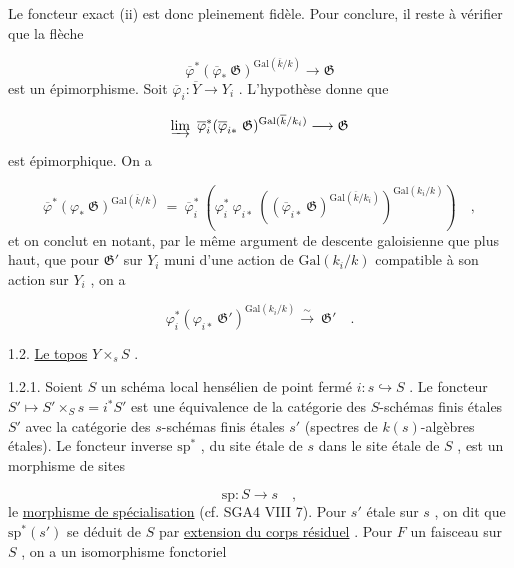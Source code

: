 Le foncteur exact (ii) est donc pleinement fidèle. Pour conclure, il reste à vérifier que la flèche

\begin{equation*}
\overline{\varphi}^*(\overline{\varphi}_* \ \mathfrak{G})^{\mathrm{Gal}(\overline{k}/k)} \longrightarrow \mathfrak{G}
\end{equation*}
est un épimorphisme. Soit $\overline{\varphi}_i : \overline{Y} \to Y_i$ . L'hypothèse donne que

\begin{equation*}
\varinjlim \ \overline{\varphi}_i^*(\overline{\varphi}_{i*} \ \mathfrak{G})^{\mathrm{Gal}(\overline{k}/k_i)} \longrightarrow \mathfrak{G} 
\end{equation*}


 est épimorphique. On a

\begin{equation*}
\overline{\varphi}^*(\varphi_* \ \mathfrak{G})^{\mathrm{Gal}(\overline{k}/k)} \ = \ \overline{\varphi}_i^* \ (\varphi_i^* \ \varphi_{i*} \ ((\overline{\varphi}_{i*} \ \mathfrak{G})^{\mathrm{Gal}(\overline{k}/k_i)})^{\mathrm{Gal}(k_i/k)}) \quad ,
\end{equation*}
et on conclut en notant, par le même argument de descente galoisienne que plus haut, que pour $\mathfrak{G}'$ sur $Y_i$ muni d'une action de $\mathrm{Gal}(k_i/k)$ compatible à son action sur $Y_i$ , on a

\begin{equation*}
\varphi_i^*(\varphi_{i*} \ \mathfrak{G}')^{\mathrm{Gal}(k_i/k)} \overset{\sim}{\longrightarrow} \ \mathfrak{G}' \quad .
\end{equation*}

1.2. \underline{Le topos} $Y \times_s S$ .

1.2.1. Soient $S$ un schéma local hensélien de point fermé $i : s \hookrightarrow S$ . Le foncteur $S' \longmapsto S' \times_S s = i^* S'$ est une équivalence de la catégorie des $S$-schémas finis étales $S'$ avec la catégorie des $s$-schémas finis étales $s'$ (spectres de $k(s)$-algèbres étales). Le foncteur inverse $\mathrm{sp}^*$ , du site étale de $s$ dans le site étale de $S$ , est un morphisme de sites

\begin{equation*}
\mathrm{sp} : S \longrightarrow s \quad ,
\end{equation*}
le \underline{morphisme de spécialisation} (cf. SGA4 VIII 7). Pour $s'$ étale sur $s$ , on dit que $\mathrm{sp}^*(s')$ se déduit de $S$ par \underline{extension du corps résiduel} . Pour $F$ un faisceau sur $S$ , on a un isomorphisme fonctoriel

